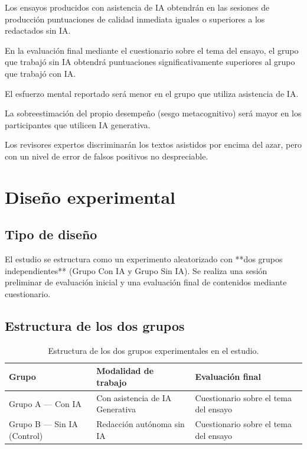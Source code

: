 \documentclass[12pt,a4paper,openany]{report}
\begin{document}
    \begin{description}[leftmargin=1.4cm,style=nextline,font=\bfseries\sffamily]
        \item[H1.] Los ensayos producidos con asistencia de IA obtendr\'an en las sesiones de producci\'on puntuaciones de calidad inmediata iguales o superiores a los redactados sin IA.
        \item[H2.] En la evaluaci\'on final mediante el cuestionario sobre el tema del ensayo, el grupo que trabaj\'o sin IA obtendr\'a puntuaciones significativamente superiores al grupo que trabaj\'o con IA.
        \item[H3.] El esfuerzo mental reportado ser\'a menor en el grupo que utiliza asistencia de IA.
        \item[H4.] La sobreestimaci\'on del propio desempe\~no (sesgo metacognitivo) ser\'a mayor en los participantes que utilicen IA generativa.
        \item[H5.] Los revisores expertos discriminar\'an los textos asistidos por encima del azar, pero con un nivel de error de falsos positivos no despreciable.
    \end{description}
    
    \chapter{Dise\~no experimental}
    \label{cap:diseno}
    
    \section{Tipo de dise\~no}
    
    El estudio se estructura como un experimento aleatorizado con **dos grupos independientes** (Grupo Con IA y Grupo Sin IA). Se realiza una sesi\'on preliminar de evaluaci\'on inicial y una evaluaci\'on final de contenidos mediante cuestionario.
    
    \section{Estructura de los dos grupos}
    
    \begin{table}[htbp]
        \centering
        \caption{Estructura de los dos grupos experimentales en el estudio.}
        \label{tab:grupos}
        \small
        \begin{tabular}{L{3.5cm} L{4.5cm} L{5.0cm}}
            \toprule
            \textbf{Grupo} & \textbf{Modalidad de trabajo} & \textbf{Evaluaci\'on final} \\
            \midrule
            Grupo A --- Con IA & Con asistencia de IA Generativa & Cuestionario sobre el tema del ensayo \\
            Grupo B --- Sin IA (Control) & Redacci\'on aut\'onoma sin IA & Cuestionario sobre el tema del ensayo \\
            \bottomrule
        \end{tabular}
    \end{table}
    
\end{document}
